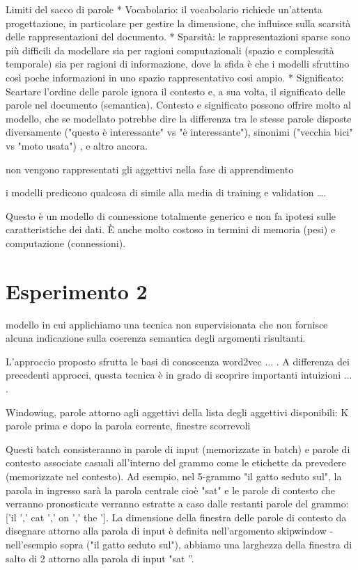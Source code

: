 Limiti del sacco di parole
* Vocabolario: il vocabolario richiede un'attenta progettazione, in particolare per gestire la dimensione, che influisce sulla scarsità delle rappresentazioni del documento.
* Sparsità: le rappresentazioni sparse sono più difficili da modellare sia per ragioni computazionali (spazio e complessità temporale) sia per ragioni di informazione, dove la sfida è che i modelli sfruttino così poche informazioni in uno spazio rappresentativo così ampio.
* Significato: Scartare l'ordine delle parole ignora il contesto e, a sua volta, il significato delle parole nel documento (semantica). Contesto e significato possono offrire molto al modello, che se modellato potrebbe dire la differenza tra le stesse parole disposte diversamente ("questo è interessante" vs "è interessante"), sinonimi ("vecchia bici" vs "moto usata") , e altro ancora.






non vengono rappresentati gli aggettivi nella fase di apprendimento 


i modelli predicono qualcosa di simile alla media di training e validation ….


Questo è un modello di connessione totalmente generico e non fa ipotesi sulle caratteristiche dei dati. È anche molto costoso in termini di memoria (pesi) e computazione (connessioni).






\section{Esperimento 2}
\label{sec:es2}
 modello in cui applichiamo una tecnica non supervisionata che non fornisce alcuna indicazione sulla coerenza semantica degli argomenti risultanti. 


	
L'approccio proposto sfrutta le basi di conoscenza word2vec ... . A differenza dei precedenti approcci, questa tecnica è in grado di scoprire importanti intuizioni ... . 


Windowing, parole attorno agli aggettivi della lista degli aggettivi disponibili:
K parole prima e dopo la parola corrente, finestre scorrevoli


Questi batch consisteranno in parole di input (memorizzate in batch) e parole di contesto associate casuali all'interno del grammo come le etichette da prevedere (memorizzate nel contesto). Ad esempio, nel 5-grammo "il gatto seduto sul", la parola in ingresso sarà la parola centrale cioè "sat" e le parole di contesto che verranno pronosticate verranno estratte a caso dalle restanti parole del grammo: ['il ',' cat ',' on ',' the ']. La dimensione della finestra delle parole di contesto da disegnare attorno alla parola di input è definita nell'argomento skipwindow - nell'esempio sopra ("il gatto seduto sul"), abbiamo una larghezza della finestra di salto di 2 attorno alla parola di input "sat ”.



